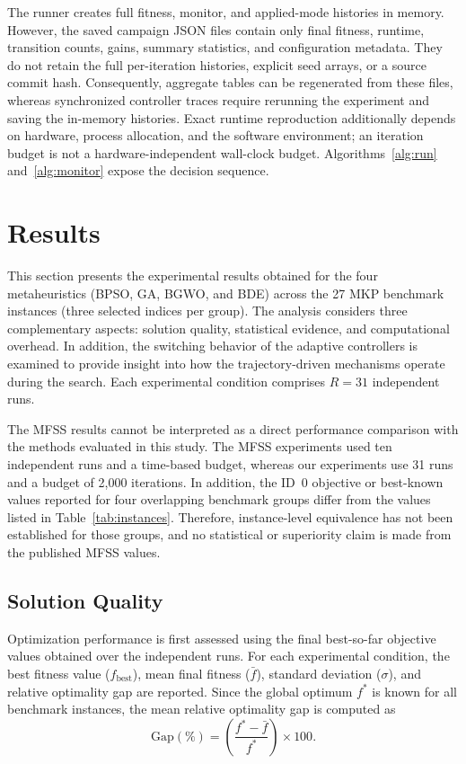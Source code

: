 \documentclass[mathematics,article,accept,moreauthors]{Definitions/mdpi}
\begin{document}
The runner creates full fitness, monitor, and applied-mode histories in
memory. However, the saved campaign JSON files contain only final fitness,
runtime, transition counts, gains, summary statistics, and configuration
metadata. They do not retain the full per-iteration histories, explicit
seed arrays, or a source commit hash. Consequently, aggregate tables can
be regenerated from these files, whereas synchronized controller traces
require rerunning the experiment and saving the in-memory histories.
Exact runtime reproduction additionally depends on hardware, process
allocation, and the software environment; an iteration budget is not a
hardware-independent wall-clock budget. Algorithms~\ref{alg:run} and~\ref{alg:monitor} expose the decision sequence.

\section{Results}
\label{sec:results}

This section presents the experimental results obtained for the four
metaheuristics (BPSO, GA, BGWO, and BDE) across the 27 MKP benchmark
instances (three selected indices per group). The analysis considers three complementary aspects: solution
quality, statistical evidence, and computational overhead. In addition,
the switching behavior of the adaptive controllers is examined to provide
insight into how the trajectory-driven mechanisms operate during the search.
Each experimental condition comprises $R=31$ independent runs.


   The MFSS results cannot be interpreted as a direct performance comparison with the methods evaluated in this study. The
 MFSS experiments used ten independent runs and a time-based budget, whereas our experiments use 31 runs and a budget of 2,000
 iterations. In addition, the ID~0 objective or best-known values reported for four overlapping benchmark groups differ from
 the values listed in Table~\ref{tab:instances}. Therefore, instance-level equivalence has not been established for those
 groups, and no statistical or superiority claim is made from the published MFSS values.
\subsection{Solution Quality}
\label{subsec:solution_quality}

Optimization performance is first assessed using the final best-so-far
objective values obtained over the independent runs. For each experimental
condition, the best fitness value ($f_{\mathrm{best}}$), mean final fitness
($\bar{f}$), standard deviation ($\sigma$), and relative optimality gap are
reported. Since the global optimum $f^*$ is known for all benchmark
instances, the mean relative optimality gap is computed as
\begin{equation}
    \text{Gap}(\%) =
    \left(
    \frac{f^*-\bar{f}}{f^*}
    \right)\times100.
    \label{eq:gap_results}
\end{equation}
\end{document}
